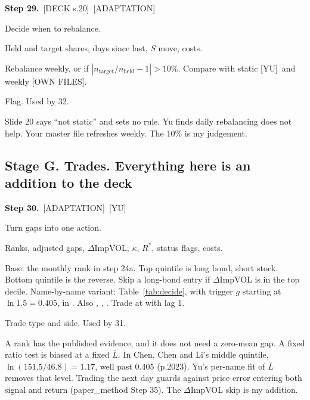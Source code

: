 \documentclass[10pt,a4paper]{article}
\newcommand{\DECK}[1]{\textsf{\footnotesize\textcolor{tagdeck}{[DECK s.#1]}}}
\newcommand{\YU}{\textsf{\footnotesize\textcolor{tagother}{[YU]}}}
\newcommand{\OWN}{\textsf{\footnotesize\textcolor{tagother}{[OWN FILES]}}}
\newcommand{\ADAPT}{\textsf{\footnotesize\textcolor{tagadapt}{[ADAPTATION]}}}
\newenvironment{step}[3]{%
  \par\needspace{5\baselineskip}\medskip\noindent\textbf{Step #1.}\ \fn{#2}\hfill#3\par\nopagebreak\small
  \begin{description}[style=sameline,leftmargin=1.7cm,labelwidth=1.5cm,labelsep=0.2cm,itemsep=1pt,parsep=0pt,topsep=1pt,font=\small\bfseries]
}{\end{description}\normalsize}
\newcommand{\Lbar}{\bar{L}}
\begin{document}
\begin{step}{29}{rehedge_due}{\DECK{20}\ \ADAPT}
\item[Purpose] Decide when to rebalance.
\item[Inputs] Held and target shares, days since last, $S$ move, costs.
\item[Formula] Rebalance weekly, or if $|n_{\text{target}}/n_{\text{held}}-1|>10\%$. Compare with static \YU\ and weekly \OWN.
\item[Outputs] Flag. Used by 32.
\item[Why] Slide 20 says ``not static'' and sets no rule. Yu finds daily rebalancing does not help. Your master file refreshes weekly. The 10\% is my judgement.
\end{step}

\subsection*{Stage G. Trades. Everything here is an addition to the deck}

\begin{step}{30}{decide_trade}{\ADAPT\ \YU}
\item[Purpose] Turn gaps into one action.
\item[Inputs] Ranks, adjusted gaps, $\Delta$ImpVOL, $\kappa$, $R^*$, status flags, costs.
\item[Formula] Base: the monthly rank in step 24a. Top quintile is long bond, short stock. Bottom quintile is the reverse. Skip a long-bond entry if $\Delta$ImpVOL is in the top decile. Name-by-name variant: Table~\ref{tab:decide}, with trigger $g$ starting at $\ln1.5=0.405$, in . Also , , . Trade at  with lag 1.
\item[Outputs] Trade type and side. Used by 31.
\item[Why] A rank has the published evidence, and it does not need a zero-mean gap. A fixed ratio test is biased at a fixed $\Lbar$. In Chen, Chen and Li's middle quintile, $\ln(151.5/46.8)=1.17$, well past 0.405 (p.2023). Yu's per-name fit of $\Lbar$ removes that level. Trading the next day guards against price error entering both signal and return (paper\_method Step 35). The $\Delta$ImpVOL skip is my addition.
\end{step}
\end{document}
